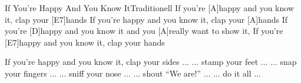 \documentclass[../main.tex]{subfiles}
\begin{document}
\begin{songwithoutpagebreak}{If You're Happy And You Know It}{Traditionell}{}
If you're [A]happy and you know it, clap your [E7]hands
If you're happy and you know it, clap your [A]hands
If you're [D]happy and you know it and you [A]really want to show it,
If you're [E7]happy and you know it, clap your hands


If you're happy and you know it, clap your sides ...
... stamp your feet ...
... snap your fingers ...
... sniff your nose ...
... shout ``We are!'' ...
... do it all ...
\end{songwithoutpagebreak}
\end{document}
